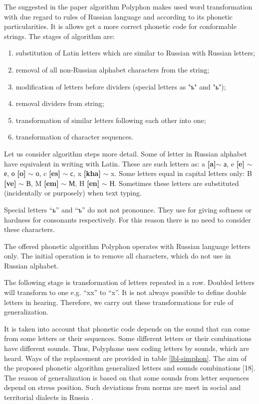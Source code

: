 \documentclass[conference,a4paper]{IEEEtran}
\begin{document}
The suggested in the paper algorithm Polyphon makes used word transformation with due regard to rules of Russian language and according to its phonetic particularities. It is allows get a more correct phonetic code for conformable strings. The stages of algorithm are:

\begin{enumerate}
\item substitution of Latin letters which are similar to Russian with Russian letters;
\item removal of all non-Russian alphabet characters from the string;
\item modification of letters before dividers (special letters as "ъ" and "ь");
\item removal dividers from string;
\item transformation of similar letters following each other into one;
\item transformation of character sequences.
\end{enumerate}

Let us consider algorithm steps more detail. Some of letter in Russian alphabet have equivalent in writing with Latin. These are such letters as: a \textbf{[a]}$\sim$ а, e \textbf{[e]} $\sim$ е, о \textbf{[o]} $\sim$ о, c \textbf{[es]} $\sim$ с, x \textbf{[kha]} $\sim$ x. Some letters equal in capital letters only: B \textbf{[ve]} $\sim$ В, M \textbf{[em]} $\sim$ М, H \textbf{[en]} $\sim$ Н. Sometimes these letters are substituted (incidentally or purposely) when text typing.

Special letters “ь” and “ъ” do not not pronounce. They use for giving softness or hardness for consonants respectively. For this reason there is no need to consider these characters.

The offered phonetic algorithm Polyphon operates with Russian language letters only. The initial operation is to remove all characters, which do not use in Russian alphabet.

The following stage is transformation of letters repeated in a row. Doubled letters will transform to one e.g. “xx” to “x”. It is not always possible to define double letters in hearing. Therefore, we carry out these transformations for rule of generalization.

It is taken into account that phonetic code depends on the sound that can come from some letters or their sequences. Some different letters or their combinations have different sounds. Thus, Polyphone uses coding letters by sounds, which are heard. Ways of the replacement are provided in table \ref{lbl-simphon}. The aim of the proposed phonetic algorithm generalized letters and sounds combinations [18]. The reason of generalization is based on that some sounds from letter sequences depend on stress position.  Such deviations from norms are meet in social and territorial dialects in Russia \cite{Zhirmunsky-1936}.
\end{document}
